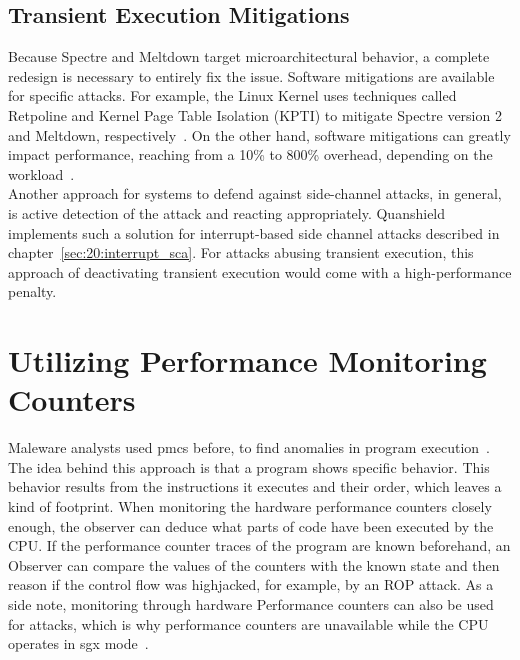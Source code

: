 \subsection{Transient Execution Mitigations}
\label{sec:20:def_sca}
Because Spectre and Meltdown target microarchitectural behavior, a complete
redesign is necessary to entirely fix the issue. Software mitigations are
available for specific attacks. For example, the Linux Kernel uses techniques
called Retpoline and Kernel Page Table Isolation (KPTI) to mitigate Spectre
version 2 and Meltdown, respectively~\cite{retpoline}. On the other hand,
software mitigations can greatly impact performance, reaching from a 10\% to
800\% overhead, depending on the workload~\cite{low2018overview}.\\

Another approach for systems to defend against side-channel attacks, in general,
is active detection of the attack and reacting appropriately. Quanshield
implements such a solution for interrupt-based side channel attacks described in
chapter~\ref{sec:20:interrupt_sca}. For attacks abusing transient execution,
this approach of deactivating transient execution would come with a
high-performance penalty.\\

\section{Utilizing Performance Monitoring Counters}
\label{sec:20:pmc}
Maleware analysts used \glspl{pmc} before, to find anomalies in program
execution~\cite{xia2012cfimon, wang2016malicious}. The idea behind this approach
is that a program shows specific behavior. This behavior results from the
instructions it executes and their order, which leaves a kind of footprint. When
monitoring the hardware performance counters closely enough, the observer can
deduce what parts of code have been executed by the CPU. If the performance
counter traces of the program are known beforehand, an Observer can compare the
values of the counters with the known state and then reason if the control flow
was highjacked, for example, by an ROP attack. As a side note, monitoring
through hardware Performance counters can also be used for attacks, which is why
performance counters are unavailable while the CPU operates in \gls{sgx}
mode~\cite{uhsadel2008exploiting,costan2016intel}.\\

